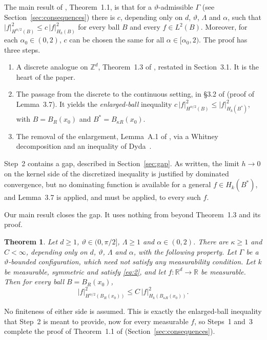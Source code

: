 \documentclass[11pt]{amsart}
\newtheorem{theorem}{Theorem}
\theoremstyle{remark}
\newcommand{\R}{\mathbb{R}}
\newcommand{\Z}{\mathbb{Z}}
\newcommand{\abs}[1]{\lvert #1\rvert}
\newcommand{\1}{\mathbf{1}}
\begin{document}
The main result of \cite{BKS}, Theorem~1.1, is that for a $\vartheta$-admissible $\Gamma$ (see
Section~\ref{sec:consequences}) there is $c$, depending only on $d$, $\vartheta$, $\Lambda$ and
$\alpha$, such that $\abs{f}^2_{H^{\alpha/2}(B)}\le c\,\abs{f}^2_{H_k(B)}$ for every ball $B$ and
every $f\in L^2(B)$. Moreover, for each $\alpha_0\in(0,2)$, $c$ can be chosen the same for all
$\alpha\in[\alpha_0,2)$. The proof has three steps.
\begin{enumerate}
\item A discrete analogue on $\Z^d$, Theorem~1.3 of \cite{BKS}, restated in Section~3.1. It is the heart of
  the paper.
\item The passage from the discrete to the continuous setting, in \S3.2 of \cite{BKS} (proof of
  Lemma~3.7). It yields the \emph{enlarged-ball} inequality
  $c\,\abs{f}^2_{H^{\alpha/2}(B)}\le\abs{f}^2_{H_k(B^*)}$, with $B=B_R(x_0)$ and $B^*=B_{\kappa R}(x_0)$.
\item The removal of the enlargement, Lemma~A.1 of \cite{BKS}, via a Whitney decomposition and an
  inequality of Dyda~\cite{Dyda}.
\end{enumerate}

Step~2 contains a gap, described in Section~\ref{sec:gap}. As written, the limit $h\to0$ on the
kernel side of the discretized inequality is justified by dominated convergence, but no dominating
function is available for a general $f\in H_k(B^*)$, and Lemma~3.7 is applied, and must be
applied, to every such $f$.

Our main result closes the gap. It uses nothing from \cite{BKS} beyond Theorem~1.3 and its proof.

\begin{theorem}\label{thm:A}
Let $d\ge1$, $\vartheta\in(0,\pi/2]$, $\Lambda\ge1$ and $\alpha\in(0,2)$. There are $\kappa\ge1$
and $C<\infty$, depending only on $d$, $\vartheta$, $\Lambda$ and $\alpha$, with the following
property. Let $\Gamma$ be a $\vartheta$-bounded configuration, which need not satisfy any
measurability condition. Let $k$ be measurable, symmetric and satisfy \eqref{eq:2}, and let
$f\colon\R^d\to\R$ be measurable. Then for every ball $B=B_R(x_0)$,
\[
  \abs{f}^2_{H^{\alpha/2}(B_R(x_0))}\le C\,\abs{f}^2_{H_k(B_{\kappa R}(x_0))}.
\]
\end{theorem}

No finiteness of either side is assumed. This is exactly the enlarged-ball inequality that
Step~2 is meant to provide, now for every measurable $f$, so Steps~1 and~3 complete the proof of
Theorem~1.1 of \cite{BKS} (Section~\ref{sec:consequences}).
\end{document}
